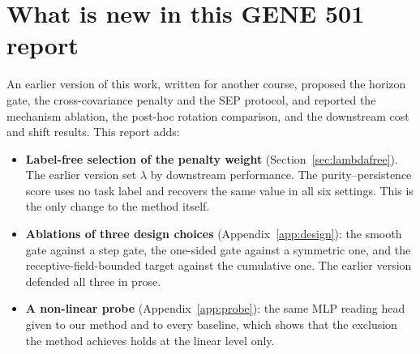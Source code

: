 \section{What is new in this GENE 501 report}

An earlier version of this work, written for another course, proposed the horizon gate, the cross-covariance penalty and the SEP protocol, and reported the mechanism ablation, the post-hoc rotation comparison, and the downstream cost and shift results. This report adds:

\begin{itemize}
\setlength{\itemsep}{2pt}
\item \textbf{Label-free selection of the penalty weight} (Section~\ref{sec:lambdafree}). The earlier version set $\lambda$ by downstream performance. The purity--persistence score uses no task label and recovers the same value in all six settings. This is the only change to the method itself.
\item \textbf{Ablations of three design choices} (Appendix~\ref{app:design}): the smooth gate against a step gate, the one-sided gate against a symmetric one, and the receptive-field-bounded target against the cumulative one. The earlier version defended all three in prose.
\item \textbf{A non-linear probe} (Appendix~\ref{app:probe}): the same MLP reading head given to our method and to every baseline, which shows that the exclusion the method achieves holds at the linear level only.
\end{itemize}
